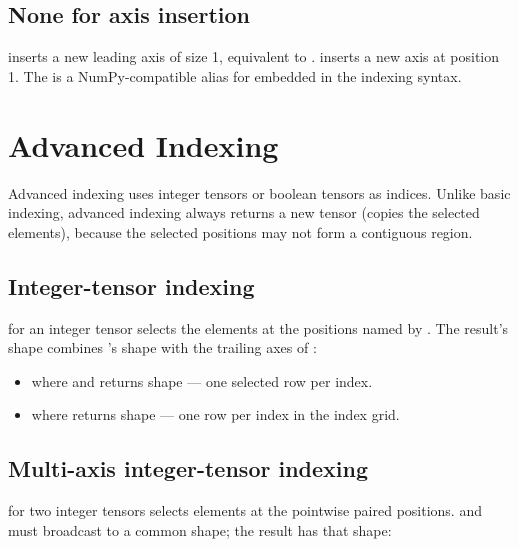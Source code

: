 \subsection{None for axis insertion}
\label{ssec:indexing:none_insert}

 inserts a new leading axis of size 1, equivalent to
.  inserts a new axis at
position 1. The  is a NumPy-compatible alias for
 embedded in the indexing syntax.

\section{Advanced Indexing}
\label{sec:indexing:advanced}

Advanced indexing uses integer tensors or boolean tensors as
indices. Unlike basic indexing, advanced indexing always returns a
new tensor (copies the selected elements), because the selected
positions may not form a contiguous region.

\subsection{Integer-tensor indexing}
\label{ssec:indexing:int_tensor}

 for an integer tensor  selects the
elements at the positions named by . The result's shape
combines 's shape with the trailing axes of :

\begin{itemize}
  \item {} where  and
     returns shape  --- one
    selected row per index.
  \item {} where  returns
    shape  --- one row per index in the index
    grid.
\end{itemize}

\subsection{Multi-axis integer-tensor indexing}
\label{ssec:indexing:multi_int}

 for two integer tensors selects
elements at the pointwise paired positions.  and
 must broadcast to a common shape; the result has
that shape:

